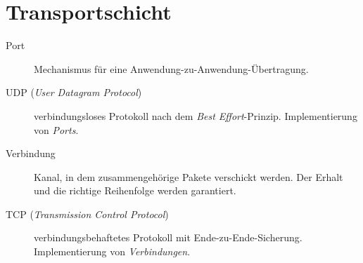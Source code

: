 \documentclass[a4paper]{article}
\begin{document}
\section{Transportschicht}

\begin{description}
    \item[Port] Mechanismus für eine Anwendung-zu-Anwendung-Übertragung.
    \item[UDP (\textit{User Datagram Protocol})] verbindungsloses Protokoll nach dem \textit{Best Effort}-Prinzip. Implementierung von \textit{Ports}.
    \item[Verbindung] Kanal, in dem zusammengehörige Pakete verschickt werden. Der Erhalt und die richtige Reihenfolge werden garantiert.
    \item[TCP (\textit{Transmission Control Protocol})] verbindungsbehaftetes Protokoll mit Ende-zu-Ende-Sicherung. Implementierung von \textit{Verbindungen}.
\end{description}
\end{document}
